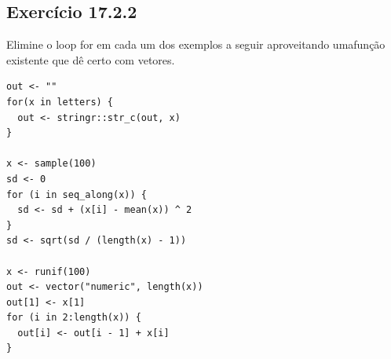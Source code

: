\documentclass[
]{latex/krantz}
\theoremstyle{definition}
\theoremstyle{definition}
\theoremstyle{definition}
\theoremstyle{definition}
\theoremstyle{remark}
\begin{document}
\hypertarget{exr17-2-2}{%
\subsection*{Exercício 17.2.2}\label{exr17-2-2}}

Elimine o loop for em cada um dos exemplos a seguir aproveitando umafunção existente que dê certo com vetores.

\begin{verbatim}
out <- ""
for(x in letters) {
  out <- stringr::str_c(out, x)
}

x <- sample(100)
sd <- 0
for (i in seq_along(x)) {
  sd <- sd + (x[i] - mean(x)) ^ 2
}
sd <- sqrt(sd / (length(x) - 1))

x <- runif(100)
out <- vector("numeric", length(x))
out[1] <- x[1]
for (i in 2:length(x)) {
  out[i] <- out[i - 1] + x[i]
}
\end{verbatim}
\end{document}

